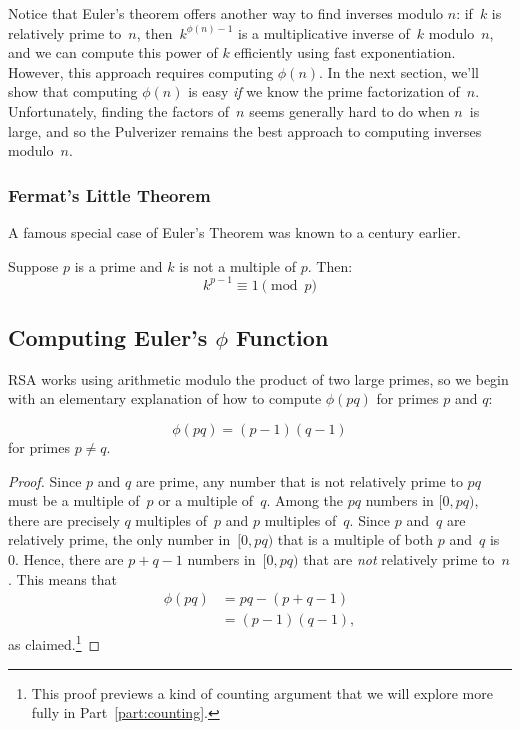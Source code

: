 Notice that Euler's theorem offers another way to find inverses modulo
$n$: if~$k$ is relatively prime to~$n$, then~$k^{\phi(n)-1}$ is a
multiplicative inverse of~$k$ modulo~$n$, and we can compute this
power of $k$ efficiently using fast exponentiation.  However, this
approach requires computing $\phi(n)$.  In the next section, we'll
show that computing $\phi(n)$ is easy \emph{if} we know the prime
factorization of~$n$.  Unfortunately, finding the factors of~$n$ seems
generally hard to do when $n$~is large, and so the Pulverizer remains
the best approach to computing inverses modulo~$n$.

\subsubsection{Fermat's Little Theorem}

A famous special case of Euler's Theorem was known to  a century earlier.
\begin{corollary}\label{fermat_little}
Suppose $p$ is a prime and $k$ is not a multiple of $p$.  Then:
\[
k^{p-1} \equiv 1 \pmod{p}
\]
\end{corollary}

\subsection{Computing Euler's $\phi$ Function}

RSA works using arithmetic modulo the product of two large primes, so we begin with an
elementary explanation of how to compute $\phi(pq)$ for primes $p$ and $q$:

\begin{lemma}\label{phi_pq}    %
\[
\phi(pq) = (p-1) (q-1)
\]
for primes $p\neq q$.
\end{lemma}

\begin{proof}
Since $p$ and $q$ are prime, any number that is not relatively prime to $pq$ must be a
multiple of~$p$ or a multiple of~$q$.  Among the $pq$ numbers in $[0, pq)$, there are
  precisely $q$ multiples of~$p$ and $p$ multiples of~$q$.  Since $p$ and~$q$ are
  relatively prime, the only number in~$[0, pq)$ that is a multiple of both $p$ and~$q$ is
    0.  Hence, there are $p + q - 1$ numbers in~$[0, pq)$ that are \emph{not} relatively
      prime to~$n$.  This means that
\begin{align*}
    \phi(pq) & = pq - (p + q - 1) \\ & = (p - 1) (q - 1),
\end{align*}
as claimed.\footnote{This proof previews a kind of counting argument that we will explore
  more fully in Part~\ref{part:counting}.}
\end{proof}

